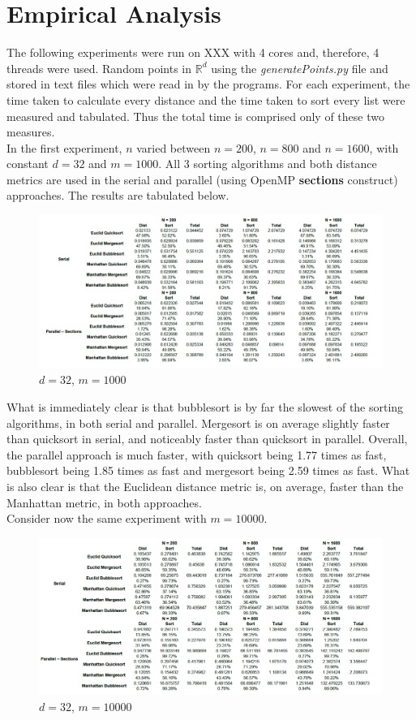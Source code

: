 \documentclass[10pt]{article}
\begin{document}
\section{Empirical Analysis}
The following experiments were run on XXX with 4 cores and, therefore, 4 threads were used. Random points in $\mathbb{R}^{d}$ using the \textit{generatePoints.py} file and stored in text files which were read in by the programs. For each experiment, the time taken to calculate every distance and the time taken to sort every list were measured and tabulated. Thus the total time is comprised only of these two measures.
\\
In the first experiment, $n$ varied between $n = 200$, $n = 800$ and $n = 1600$, with constant $d = 32$ and $m = 1000$. All 3 sorting algorithms and both distance metrics are used in the serial and parallel (using OpenMP \textbf{sections} construct) approaches. The results are tabulated below.
\begin{figure}[H]
\caption{$d = 32$, $m = 1000$}
\centering
\includegraphics[scale=0.5]{d32m1000.png}
\end{figure}
What is immediately clear is that bubblesort is by far the slowest of the sorting algorithms, in both serial and parallel. Mergesort is on average slightly faster than quicksort in serial, and noticeably faster than quicksort in parallel. Overall, the parallel approach is much faster, with quicksort being 1.77 times as fast, bubblesort being 1.85 times as fast and mergesort being 2.59 times as fast. What is also clear is that the Euclidean distance metric is, on average, faster than the Manhattan metric, in both approaches.
\\
Consider now the same experiment with $m=10 000$.
\begin{figure}[H]
\caption{$d = 32$, $m = 10000$}
\centering
\includegraphics[scale=0.5]{d32m10000.png}
\end{figure}
\end{document}
